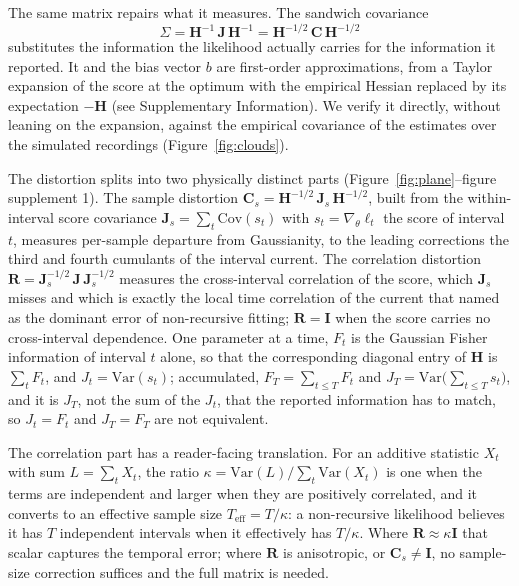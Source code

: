 The same matrix repairs what it measures. The sandwich covariance \cite{huber1967behavior,godambe1960optimum}
\[ \Sigma=\mathbf{H}^{-1}\,\mathbf{J}\,\mathbf{H}^{-1}=\mathbf{H}^{-1/2}\,\mathbf{C}\,\mathbf{H}^{-1/2} \]
substitutes the information the likelihood actually carries for the information it reported. It and the bias vector $b$ are first-order approximations, from a Taylor expansion of the score at the optimum with the empirical Hessian replaced by its expectation $-\mathbf{H}$ (see Supplementary Information). We verify it directly, without leaning on the expansion, against the empirical covariance of the estimates over the simulated recordings (Figure~\ref{fig:clouds}).

The distortion splits into two physically distinct parts (Figure~\ref{fig:plane}--figure supplement 1).
The sample distortion $\mathbf{C}_s=\mathbf{H}^{-1/2}\,\mathbf{J}_s\,\mathbf{H}^{-1/2}$, built from the within-interval score covariance $\mathbf{J}_s=\sum_t\mathrm{Cov}(s_t)$ with $s_t=\nabla_\theta\ell_t$ the score of interval $t$, measures per-sample departure from Gaussianity, to the leading corrections the third and fourth cumulants of the interval current. The correlation distortion $\mathbf{R}=\mathbf{J}_s^{-1/2}\,\mathbf{J}\,\mathbf{J}_s^{-1/2}$ measures the cross-interval correlation of the score, which $\mathbf{J}_s$ misses and which is exactly the local time correlation of the current that \cite{milescu2005maximum} named as the dominant error of non-recursive fitting; $\mathbf{R}=\mathbf{I}$ when the score carries no cross-interval dependence. One parameter at a time, $F_t$ is the Gaussian Fisher information of interval $t$ alone, so that the corresponding diagonal entry of $\mathbf{H}$ is $\sum_t F_t$, and $J_t=\mathrm{Var}(s_t)$; accumulated, $F_T=\sum_{t\le T}F_t$ and $J_T=\mathrm{Var}\bigl(\sum_{t\le T}s_t\bigr)$, and it is $J_T$, not the sum of the $J_t$, that the reported information has to match, so $J_t=F_t$ and $J_T=F_T$ are not equivalent.

The correlation part has a reader-facing translation. For an additive statistic $X_t$ with sum $L=\sum_t X_t$, the ratio $\kappa=\mathrm{Var}(L)\big/\sum_t\mathrm{Var}(X_t)$ is one when the terms are independent and larger when they are positively correlated, and it converts to an effective sample size $T_\mathrm{eff}=T/\kappa$: a non-recursive likelihood believes it has $T$ independent intervals when it effectively has $T/\kappa$. Where $\mathbf{R}\approx\kappa\mathbf{I}$ that scalar captures the temporal error; where $\mathbf{R}$ is anisotropic, or $\mathbf{C}_s\neq\mathbf{I}$, no sample-size correction suffices and the full matrix is needed.

